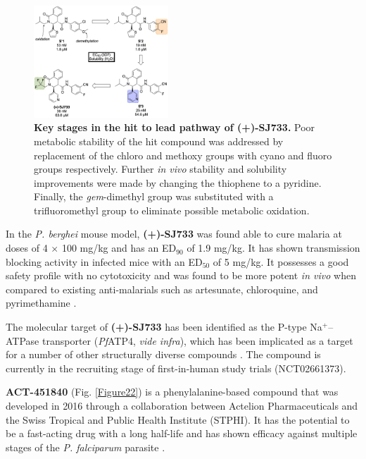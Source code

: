 \documentclass[twocolumn]{bmcart}%
\begin{document}
\begin{figure}[h]
	\includegraphics [width=0.45\textwidth] {Figure21}
	\caption{{\bf Key stages in the hit to lead pathway of (+)-SJ733.} Poor metabolic stability of the hit compound was addressed by replacement of the chloro and methoxy groups with cyano and fluoro groups respectively. Further \textit{in vivo} stability and solubility improvements were made by changing the thiophene to a pyridine. Finally, the \textit{gem}-dimethyl group was substituted with a trifluoromethyl group to eliminate possible metabolic oxidation.}
	\label{Figure21}
\end{figure}

In the \textit{P. berghei} mouse model, \textbf{(+)-SJ733} was found able to cure malaria at doses of 4 $\times$ 100 mg/kg and has an ED$_{90}$ of 1.9 mg/kg. It has shown transmission blocking activity in infected mice with an ED$_{50}$ of 5 mg/kg. It possesses a good safety profile with no cytotoxicity and was found to be more potent \textit{in vivo} when compared to existing anti-malarials such as artesunate, chloroquine, and pyrimethamine \cite{Jimenez-Diaz2014}.

The molecular target of \textbf{(+)-SJ733} has been identified as the P-type Na$^+$--ATPase transporter (\textit{Pf}ATP4, \textit{vide infra}), which has been implicated as a target for a number of other structurally diverse compounds \cite{Spillman2015}. The compound is currently in the recruiting stage of first-in-human study trials (NCT02661373).

\hrulefill

\textbf{ACT-451840} (Fig. \ref{Figure22}) is a phenylalanine-based compound that was developed in 2016 through a collaboration between Actelion Pharmaceuticals and the Swiss Tropical and Public Health Institute (STPHI). It has the potential to be a fast-acting drug with a long half-life and has shown efficacy against multiple stages of the \textit{P. falciparum} parasite \cite{Boss2016}.
\end{document}

